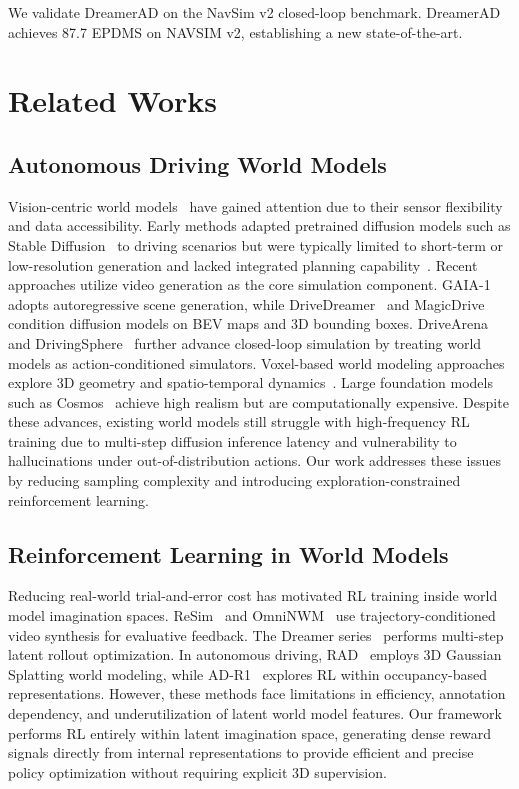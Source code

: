 \documentclass[runningheads]{llncs}
\begin{document}
We validate DreamerAD on the NavSim v2 closed-loop benchmark. DreamerAD achieves 87.7 EPDMS on NAVSIM v2, establishing a new state-of-the-art.

\section{Related Works}

\subsection{Autonomous Driving World Models}

Vision-centric world models~\cite{babaeizadeh2017stochastic, ha2018recurrent} have gained attention due to their sensor flexibility and data accessibility. Early methods adapted pretrained diffusion models such as Stable Diffusion~\cite{rombach2022high} to driving scenarios but were typically limited to short-term or low-resolution generation and lacked integrated planning capability~\cite{gao2023magicdrive}. 
Recent approaches utilize video generation as the core simulation component. GAIA-1~\cite{hu2023gaia} adopts autoregressive scene generation, while DriveDreamer~\cite{wang2024drivedreamer} and MagicDrive~\cite{gao2023magicdrive} condition diffusion models on BEV maps and 3D bounding boxes. DriveArena~\cite{yang2025drivearena} and DrivingSphere~\cite{yan2025drivingsphere} further advance closed-loop simulation by treating world models as action-conditioned simulators. Voxel-based world modeling approaches explore 3D geometry and spatio-temporal dynamics~\cite{zheng2024occworld}. Large foundation models such as Cosmos~\cite{agarwal2025cosmos} achieve high realism but are computationally expensive.
Despite these advances, existing world models still struggle with high-frequency RL training due to multi-step diffusion inference latency and vulnerability to hallucinations under out-of-distribution actions. Our work addresses these issues by reducing sampling complexity and introducing exploration-constrained reinforcement learning.

\subsection{Reinforcement Learning in World Models}

Reducing real-world trial-and-error cost has motivated RL training inside world model imagination spaces. ReSim~\cite{yang2025resim} and OmniNWM~\cite{li2025omninwm} use trajectory-conditioned video synthesis for evaluative feedback. The Dreamer series~\cite{hafner2019dream,hafner2020mastering,hafner2023mastering} performs multi-step latent rollout optimization.
In autonomous driving, RAD~\cite{gao2025rad} employs 3D Gaussian Splatting world modeling, while AD-R1~\cite{yan2025ad} explores RL within occupancy-based representations. However, these methods face limitations in efficiency, annotation dependency, and underutilization of latent world model features.
Our framework performs RL entirely within latent imagination space, generating dense reward signals directly from internal representations to provide efficient and precise policy optimization without requiring explicit 3D supervision.
\end{document}
